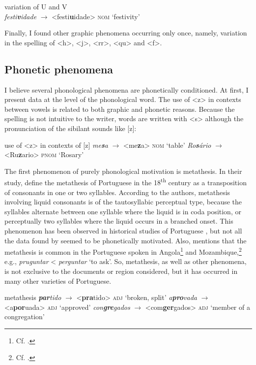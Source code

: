 \documentclass[output=paper,colorlinks,citecolor=brown]{langscibook}
\begin{document}
\ea\label{ex:6:3} variation of U and V\\
\emph{festi\textbf{v}idade} $\rightarrow$ <festi\textbf{u}idade> \textsc{nom} ‘festivity’
\z

Finally, I found other graphic phenomena occurring only once, namely, variation in the spelling of <h>, <j>, <rr>, <qu> and <f>.

\subsection{Phonetic phenomena}

I believe several phonological phenomena are phonetically conditioned. At first, I present data at the level of the phonological word. The use of <z> in contexts between vowels is related to both graphic and phonetic reasons. Because the spelling is not intuitive to the writer, words are written with <s> although the pronunciation of the sibilant sounds like [z]:

\ea\label{ex:6:4} use of <z> in contexts of [z]
\ea \emph{me\textbf{s}a} $\rightarrow$ <me\textbf{z}a>       \textsc{nom} ‘table’
\ex \emph{Ro\textbf{s}ário} $\rightarrow$ <Ru\textbf{z}ario> \textsc{pnom} ‘Rosary’
    \z
\z

The first phenomenon of purely phonological motivation is metathesis. In their study, \citet{Hora_Telles_Monaretto_2007} define the metathesis of Portuguese in the 18\textsuperscript{th} century as a transposition of consonants in one or two syllables. According to the authors, metathesis involving liquid consonants is of the tautosyllabic perceptual type, because the syllables alternate between one syllable where the liquid is in coda position, or perceptually two syllables where the liquid occurs in a branched onset. This phenomenon has been observed in historical studies of Portuguese \citep{Coutinho_1976,Faria_1970,Oliveira_2006}, but not all the data found by \citet[349]{Oliveira_2006} seemed to be phonetically motivated. Also, \citet[162]{Petter_2009} mentions that the metathesis is common in the Portuguese spoken in Angola\footnote{Cf. \citet{Chavagne_2005}.} and Mozambique,\footnote{Cf. \citet{Laban_1999}.} e.g., \emph{pruguntar} < \emph{perguntar} ‘to ask’. So, metathesis, as well as other phenomena, is not exclusive to the documents or region considered, but it has occurred in many other varieties of Portuguese.

\ea\label{ex:6:5} metathesis
    \ea \emph{\textbf{par}tido} $\rightarrow$ <\textbf{pra}tido> \textsc{adj} ‘broken, split’
    \ex \emph{a\textbf{pro}vada} $\rightarrow$ <a\textbf{por}uada> \textsc{adj} ‘approved’
    \ex \emph{con\textbf{gre}gados} $\rightarrow$  <com\textbf{ger}gados> \textsc{adj} ‘member of a congregation’
\z
\z
\end{document}

